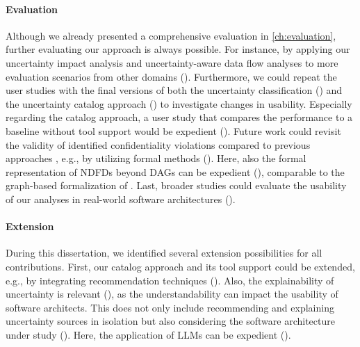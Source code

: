 \paragraph{Evaluation}
Although we already presented a comprehensive evaluation in \autoref{ch:evaluation}, further evaluating our approach is always possible.
For instance, by applying our uncertainty impact analysis and uncertainty-aware data flow analyses to more evaluation scenarios from other domains ().
Furthermore, we could repeat the user studies with the final versions of both the uncertainty classification () and the uncertainty catalog approach () to investigate changes in usability.
Especially regarding the catalog approach, a user study that compares the performance to a baseline without tool support would be expedient ().
Future work could revisit the validity of identified confidentiality violations compared to previous approaches \cite{seifermann_data-driven_2019,seifermann_detecting_2022}, e.g., by utilizing formal methods ().
Here, also the formal representation of \acfp{NDFD} beyond \acfp{DAG} can be expedient (), comparable to the graph-based formalization of \textcite{alshareef_precise_2022}.
Last, broader studies could evaluate the usability of our analyses in real-world software architectures ().


\paragraph{Extension}
During this dissertation, we identified several extension possibilities for all contributions.
First, our catalog approach and its tool support \arcen could be extended, e.g., by integrating recommendation techniques ().
Also, the explainability \cite{bersani_conceptual_2023,bersani_architecting_2023} of uncertainty is relevant (), as the understandability can impact the usability of software architects.
This does not only include recommending and explaining uncertainty sources in isolation but also considering the software architecture under study ().
Here, the application of \acfp{LLM} can be expedient ().

